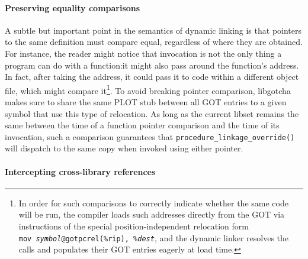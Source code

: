 

\paragraph{Preserving equality comparisons}

A subtle but important point in the semantics of dynamic linking is that pointers to
the same definition must compare equal, regardless of where they are obtained.  For
instance,
the reader might notice that invocation is not the only thing a program can do with a
function:\@ it might also pass around the function's address.  In fact, after taking
the address, it could pass it to code within a different object file, which might
compare it\footnote{In order for such comparisons to correctly indicate whether the
same code will be run, the compiler loads such addresses directly from the GOT via
instructions of the special position-independent relocation form
\texttt{mov~\textit{symbol}@gotpcrel(\%rip),~\%\textit{dest}}, and the dynamic linker
resolves the calls and populates their GOT entries eagerly at load time.}.  To avoid
breaking pointer comparison, libgotcha makes sure to share the same PLOT
stub between all GOT entries to a given symbol that use this type of
relocation.  As long as the current libset remains the same between the time of a
function pointer comparison and the time of its invocation, such a comparison
guarantees that \texttt{procedure\_linkage\_override()} will dispatch to the same
copy when invoked using either pointer.

\paragraph{Intercepting cross-library references}

